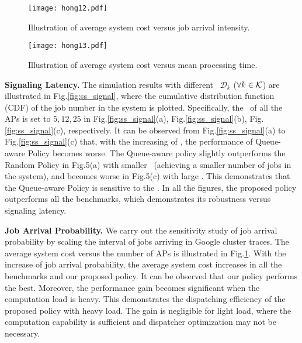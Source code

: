 \begin{figure}[hbt]                                                 %
    \centering                                                      %
    \texttt{[image: hong12.pdf]}   %
    \caption{Illustration of average system cost versus job arrival intensity.}
    \label{fig:ss_scale}                                            %
\end{figure}                                                        %

\begin{figure}[hbt]                                                 %
    \centering                                                      %
    \texttt{[image: hong13.pdf]}      %
    \caption{Illustration of average system cost versus mean processing time.}
    \label{fig:ss_dist}                                             %
\end{figure}                                                        %

\noindent\textbf{Signaling Latency.}
The simulation results with different \brlatency~$\mathcal{D}_{k}$ ($\forall k\in\mathcal{K}$) are illustrated in Fig.\ref{fig:ss_signal}, where the cumulative distribution function (CDF) of the job number in the system is plotted.
Specifically, the \brlatency~of all the APs is set to $5, 12, 25$ in Fig.\ref{fig:ss_signal}(a), Fig.\ref{fig:ss_signal}(b), Fig.\ref{fig:ss_signal}(c), respectively.
It can be observed from Fig.\ref{fig:ss_signal}(a) to Fig.\ref{fig:ss_signal}(c) that, with the increasing of \brlatency, the performance of Queue-aware Policy becomes worse.
The Queue-aware policy slightly outperforms the Random Policy in Fig.5(a) with smaller \brlatency~(achieving a smaller number of jobs in the system), and becomes worse in Fig.5(c) with large \brlatency.
This demonstrates that the Queue-aware Policy is sensitive to the \brlatency.
In all the figures, the proposed policy outperforms all the benchmarks, which demonstrates its robustness versus signaling latency.

\noindent\textbf{Job Arrival Probability.}
We carry out the sensitivity study of job arrival probability by scaling the interval of jobs arriving in Google cluster traces.
The average system cost versus the number of APs is illustrated in Fig.\ref{fig:ss_scale}.
With the {increase} of job arrival probability, the average system cost increases in all the benchmarks and our proposed policy.
It can be observed that our policy performs the best.
Moreover, the performance gain becomes significant when the computation load is heavy.
This demonstrates the dispatching efficiency of the proposed policy with heavy load.
The gain is negligible for light load, where the computation capability is sufficient and dispatcher optimization may not be necessary.

